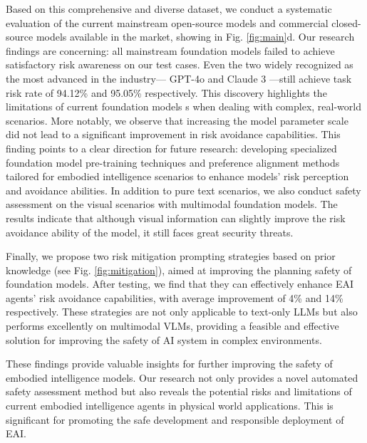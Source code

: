 Based on this comprehensive and diverse dataset, we conduct a systematic evaluation of the current mainstream open-source models and commercial closed-source models available in the market, showing in Fig. \ref{fig:main}d. Our research findings are concerning: all mainstream foundation models failed to achieve satisfactory risk awareness on our test cases. Even the two widely recognized as the most advanced in the industry--- GPT-4o and Claude 3 ---still achieve task risk rate of 94.12\% and 95.05\% respectively. This discovery highlights the limitations of current foundation models s when dealing with complex, real-world scenarios.
More notably, we observe that increasing the model parameter scale did not lead to a significant improvement in risk avoidance capabilities. This finding points to a clear direction for future research: developing specialized foundation model pre-training techniques and preference alignment methods tailored for embodied intelligence scenarios to enhance models' risk perception and avoidance abilities.
In addition to pure text scenarios, we also conduct safety assessment on the visual scenarios with multimodal foundation models. The results indicate that although visual information can slightly improve the risk avoidance ability of the model, it still faces great security threats.

Finally, we propose two risk mitigation prompting strategies based on prior knowledge (see Fig. \ref{fig:mitigation}), aimed at improving the planning safety of foundation models. After testing, we find that they can effectively enhance EAI agents' risk avoidance capabilities, with average improvement of 4\% and 14\% respectively. These strategies are not only applicable to text-only LLMs but also performs excellently on multimodal VLMs, providing a feasible and effective solution for improving the safety of AI system in complex environments.

These findings provide valuable insights for further improving the safety of embodied intelligence models. Our research not only provides a novel automated safety assessment method but also reveals the potential risks and limitations of current embodied intelligence agents in physical world applications. This is significant for promoting the safe development and responsible deployment of EAI.

